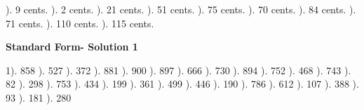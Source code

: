 \documentclass{article}%
\begin{document}
). 9 cents.%
). 2 cents.%
). 21 cents.%
). 51 cents.%
). 75 cents.%
). 70 cents.%
). 84 cents.%
). 71 cents.%
). 110 cents.%
). 115 cents.%
\newline%
\newpage%
\large%
\begin{center}%
\textbf{Standard Form- Solution 1}%
\newline%
\end{center} \normalsize%
1). 858%
). 527%
). 372%
). 881%
). 900%
). 897%
). 666%
). 730%
). 894%
). 752%
). 468%
). 743%
). 82%
). 298%
). 753%
). 434%
). 199%
). 361%
). 499%
). 446%
). 190%
). 786%
). 612%
). 107%
). 388%
). 93%
). 181%
). 280%
\newline%
\end{document}
